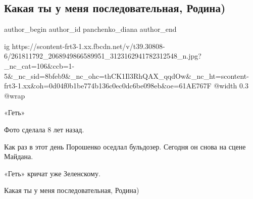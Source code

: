  
 
 
 
 
 
\subsection{Какая ты у меня последовательная, Родина)}
\label{sec:01_12_2021.fb.panchenko_diana.1.rodina_maidan}
 
\ifcmt
 author_begin
   author_id panchenko_diana
 author_end
\fi


\ifcmt
  ig https://scontent-frt3-1.xx.fbcdn.net/v/t39.30808-6/261811792_2068949866589951_3123162941782312548_n.jpg?_nc_cat=106&ccb=1-5&_nc_sid=8bfeb9&_nc_ohc=thCK1Il3RhQAX_qqdOw&_nc_ht=scontent-frt3-1.xx&oh=0d04f0b1be774b136c0ec0dc6be098eb&oe=61AE767F
  @width 0.3
  @wrap 
\fi

«Геть»

Фото сделала 8 лет назад. 

Как раз в этот день Порошенко оседлал бульдозер. Сегодня он снова на сцене
Майдана. 

«Геть» кричат уже Зеленскому. 

Какая ты у меня последовательная, Родина)

\vspace{3cm}

